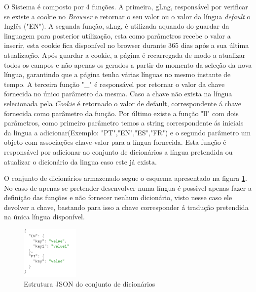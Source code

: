 \par O Sistema é composto por 4 funções. A primeira, gLng, responsável por verificar se existe a cookie no \textit{Browser} e retornar o seu valor ou o valor da língua \textit{default} o Inglês ("EN"). A segunda função, sLng, é utilizada aquando do guardar da linguagem para posterior utilização, esta como parâmetros recebe o valor a inserir, esta cookie fica disponível no browser durante 365 dias após a sua última atualização. Após guardar a cookie, a página é recarregada de modo a atualizar todos os campos e não apenas os gerados a partir do momento da seleção da nova língua, garantindo que a página tenha várias línguas no mesmo instante de tempo. A terceira função "\_" é responsável por retornar o valor da chave fornecida no único parâmetro da mesma. Caso a chave não exista na língua selecionada pela \textit{Cookie} é retornado o valor de default, correspondente á chave fornecida como parâmetro da função. Por último existe a função "ll" com dois parâmetros, como primeiro parâmetro temos a string correspondente ás iniciais da lingua a adicionar(Exemplo: "PT","EN","ES","FR") e o segundo parâmetro um objeto com associações chave-valor  para a língua fornecida. Esta função é responsável por adicionar ao conjunto de dicionários a língua pretendida ou atualizar o dicionário da lingua caso este já exista.
\par O conjunto de dicionários armazenado segue o esquema  apresentado na figura \ref{dicextr}. No caso de apenas se pretender desenvolver numa língua é possivel apenas fazer a definição das funções e não fornecer nenhum dicionário, visto nesse caso ele devolver a chave, bastando para isso a chave corresponder á tradução pretendida na única língua disponível.



 \begin{figure}[ht]
\centering
\includegraphics[width=0.25\textwidth]{images/extrjson.png}
\caption{Estrutura JSON do conjunto de dicionários}\label{dicextr}
\end{figure}

